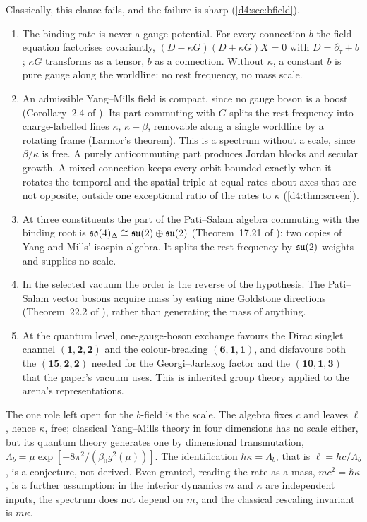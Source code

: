 Classically, this clause fails, and the failure is sharp (\cref{d4:sec:bfield}).
\begin{enumerate}
\item The binding rate is never a gauge potential. For every connection $b$ the field equation factorises covariantly,
$(D-\kappa G)(D+\kappa G)X=0$ with $D=\partial_\tau+b$; $\kappa G$ transforms as a tensor, $b$ as a connection. Without $\kappa$, a constant $b$
is pure gauge along the worldline: no rest frequency, no mass scale.
\item An admissible Yang--Mills field is compact, since no gauge boson is a boost (Corollary~2.4 of \cite{ES17}). Its part commuting with
$G$ splits the rest frequency into charge-labelled lines $\kappa$, $\kappa\pm\beta$, removable along a single worldline by a rotating frame
(Larmor's theorem). This is a spectrum without a scale, since $\beta/\kappa$ is free. A purely anticommuting part produces Jordan blocks and
secular growth. A mixed connection keeps every orbit bounded exactly when it rotates the temporal and the spatial triple at equal rates about
axes that are not opposite, outside one exceptional ratio of the rates to $\kappa$ (\cref{d4:thm:screen}).
\item At three constituents the part of the Pati--Salam algebra commuting with the binding root is $\mathfrak{so}(4)_\Delta\cong\mathfrak{su}(2)\oplus\mathfrak{su}(2)$
(Theorem~17.21 of \cite{ES17}): two copies of Yang and Mills' isospin algebra. It splits the rest frequency by $\mathfrak{su}(2)$ weights and supplies
no scale.
\item In the selected vacuum the order is the reverse of the hypothesis. The Pati--Salam vector bosons acquire mass by eating nine
Goldstone directions (Theorem~22.2 of \cite{ES17}), rather than generating the mass of anything.
\item At the quantum level, one-gauge-boson exchange favours the Dirac singlet channel $(\mathbf1,\mathbf2,\mathbf2)$ and the
colour-breaking $(\mathbf6,\mathbf1,\mathbf1)$, and disfavours both the $(\mathbf{15},\mathbf2,\mathbf2)$ needed for the Georgi--Jarlskog factor
and the $(\mathbf{10},\mathbf1,\mathbf3)$ that the paper's vacuum uses. This is inherited group theory applied to the arena's representations.
\end{enumerate}
The one role left open for the $b$-field is the scale. The algebra fixes $c$ and leaves $\ell$, hence $\kappa$, free; classical Yang--Mills
theory in four dimensions has no scale either, but its quantum theory generates one by dimensional transmutation,
$\Lambda_b=\mu\exp[-8\pi^2/(\beta_0g^2(\mu))]$. The identification $\hbar\kappa=\Lambda_b$, that is $\ell=\hbar c/\Lambda_b$, is a conjecture,
not derived. Even granted, reading the rate as a mass, $mc^2=\hbar\kappa$, is a further assumption: in the interior dynamics $m$ and $\kappa$
are independent inputs, the spectrum does not depend on $m$, and the classical rescaling invariant is $m\kappa$.

